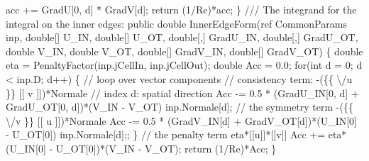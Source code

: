 {\btab \btab \btab acc += GradU[0, d] * GradV[d];\newline 
\btab \btab return (1/Re)*acc;\newline 
\btab \}\newline 
 \newline 
 \newline 
    /// The integrand for the integral on the inner edges:
\btab public double InnerEdgeForm(ref CommonParams inp, \newline 
\btab \btab double[] U\_IN, double[] U\_OT, double[,] GradU\_IN, double[,] GradU\_OT, \newline 
\btab \btab double V\_IN, double V\_OT, double[] GradV\_IN, double[] GradV\_OT) \{\newline 
 \newline 
\btab \btab double eta = PenaltyFactor(inp.jCellIn, inp.jCellOut);\newline 
 \newline 
\btab \btab double Acc = 0.0;\newline 
\btab \btab for(int d = 0; d < inp.D; d++) \{ // loop over vector components \newline 
\btab \btab \btab // consistency term: -(\{\{ \textbackslash /u \}\} [[ v ]])*Normale\newline 
\btab \btab \btab // index d: spatial direction\newline 
\btab \btab \btab Acc -= 0.5 * (GradU\_IN[0, d] + GradU\_OT[0, d])*(V\_IN - V\_OT)\newline 
\btab \btab \btab \btab \btab    * inp.Normale[d];\newline 
 \newline 
\btab \btab \btab // the symmetry term -(\{\{ \textbackslash /v \}\} [[ u ]])*Normale\newline 
\btab \btab \btab Acc -= 0.5 * (GradV\_IN[d] + GradV\_OT[d])*(U\_IN[0] - U\_OT[0])\newline 
\btab \btab \btab \btab \btab    * inp.Normale[d];;\newline 
\btab \btab \}\newline 
 \newline 
\btab \btab // the penalty term eta*[[u]]*[[v]]\newline 
\btab \btab Acc += eta*(U\_IN[0] - U\_OT[0])*(V\_IN - V\_OT);\newline 
\btab \btab return (1/Re)*Acc;\newline 
 \newline 
\btab \}\newline 
 \newline 
}

